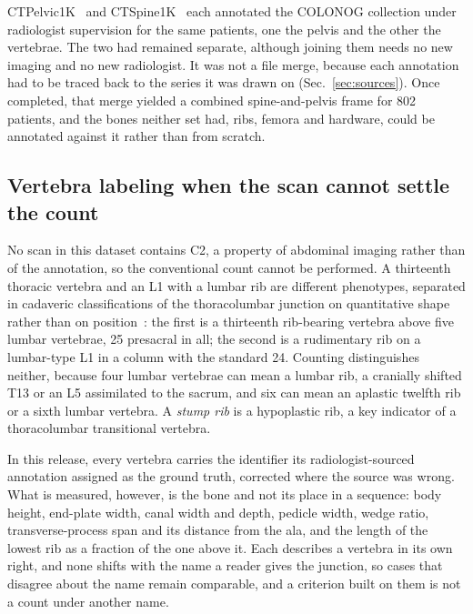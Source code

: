 \documentclass[aapm,mph,amsmath,amssymb,reprint]{revtex4-2}
\begin{document}
CTPelvic1K~\cite{ctpelvic1k} and CTSpine1K~\cite{ctspine1k} each annotated the COLONOG
collection under radiologist supervision for the same patients, one the pelvis and the other the vertebrae. The two had remained separate, although joining them needs no new imaging and no new radiologist. It was not a file merge, because each annotation had to be traced back to the series it was
drawn on (Sec.~\ref{sec:sources}). Once completed, that merge yielded a combined spine-and-pelvis frame
for 802 patients, and the bones neither set had, ribs, femora and hardware, could be
annotated against it rather than from scratch.



\subsection{Vertebra labeling when the scan cannot settle the count}

No scan in this dataset contains C2, a property of abdominal imaging rather than of the
annotation, so the conventional count cannot be performed. A thirteenth thoracic vertebra and
an L1 with a lumbar rib are different phenotypes, separated in cadaveric classifications of
the thoracolumbar junction on quantitative shape rather than on
position~\cite{duplessis2018,poolman2023}: the first is a thirteenth rib-bearing vertebra
above five lumbar vertebrae, 25 presacral in all; the second is a rudimentary rib on a
lumbar-type L1 in a column with the standard 24. Counting distinguishes neither, because four
lumbar vertebrae can mean a lumbar rib, a cranially shifted T13 or an L5 assimilated to the
sacrum, and six can mean an aplastic twelfth rib or a sixth lumbar vertebra. A \emph{stump
rib} is a hypoplastic rib, a key indicator of a thoracolumbar transitional vertebra.

In this release, every vertebra carries the identifier its radiologist-sourced annotation
assigned as the ground truth, corrected where the source was wrong. What is measured, however,
is the bone and not its place in a sequence: body height, end-plate width, canal width and
depth, pedicle width, wedge ratio, transverse-process span and its distance from the ala, and
the length of the lowest rib as a fraction of the one above it. Each describes a vertebra in
its own right, and none shifts with the name a reader gives the junction, so cases that
disagree about the name remain comparable, and a criterion built on them is not a count under
another name.
\end{document}
